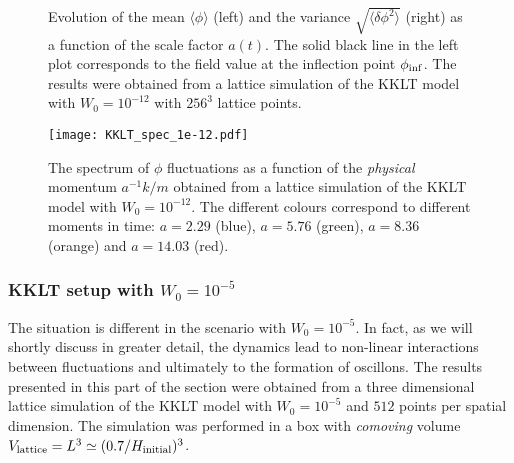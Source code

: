 \documentclass[12pt]{article}
\begin{document}
\begin{figure}
\centering
{}
\hfill
{}
\caption{Evolution of the mean $\langle\phi\rangle$ (left) and the variance $\sqrt{\langle\delta\phi^2\rangle}$ (right) as a function of the scale factor $a(t)$. The solid black line in the left plot corresponds to the field value at the inflection point $\phi_{\rm inf}$. The results were obtained from a lattice simulation of the KKLT model with $W_0=10^{-12}$ with $256^3$ lattice points.}
\label{fig:mean_variance_KKLT_1e-12}
\end{figure}

\begin{figure}
\begin{center}\texttt{[image: KKLT\_spec\_1e-12.pdf]}
\end{center}
\caption{The spectrum of $\phi$ fluctuations as a function of the \textit{physical} momentum $a^{-1}k/m$ obtained from a lattice simulation of the KKLT model with $W_0=10^{-12}$. The different colours correspond to different moments in time: $a=2.29$ (blue), $a=5.76$  (green), $a=8.36$ (orange) and $a=14.03$ (red).}
\label{fig:KKLT_spec_1e-12}
\end{figure}


\subsubsection*{KKLT setup with $W_0=10^{-5}$}
\label{sec:KKLT_1e-5}

The situation is different in the scenario with $W_0=10^{-5}$. In fact, as we will shortly discuss in greater detail, the dynamics lead to non-linear interactions between fluctuations and ultimately to the formation of oscillons. The results presented in this part of the section were obtained from a three dimensional lattice simulation of the KKLT model with $W_0=10^{-5}$ and $512$ points per spatial dimension. The simulation was performed in a box with \textit{comoving} volume $V_{\rm lattice} = L^3 \simeq (0.7/H_{\rm initial})^3$.
\end{document}
